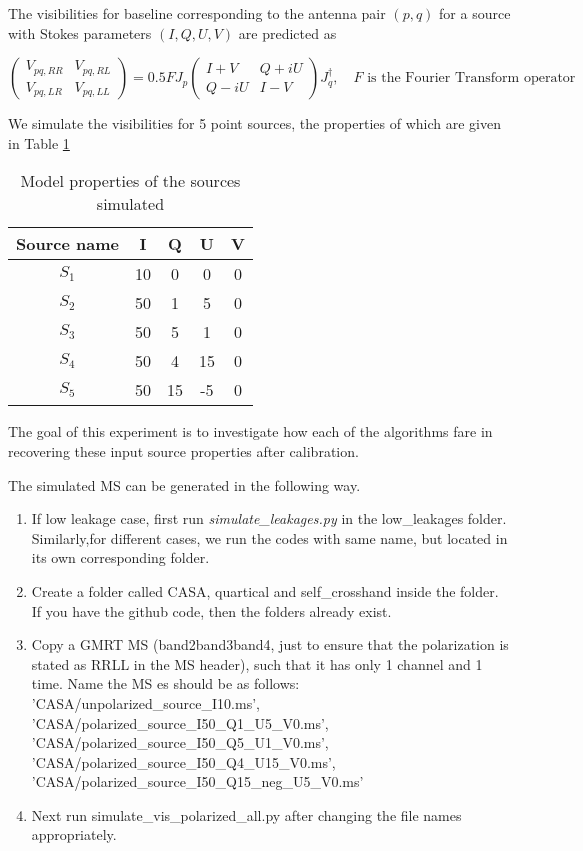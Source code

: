 \documentclass{article}
\begin{document}
The visibilities for baseline corresponding to the antenna pair $(p,q)$ for a source with Stokes parameters $(I,Q,U,V)$ are predicted as

\begin{equation}
\begin{pmatrix}
V_{pq,RR} & V_{pq,RL}\\
V_{pq,LR} & V_{pq,LL}
\end{pmatrix}=0.5 F J_p 
\begin{pmatrix}
I+V & Q+iU\\
Q-iU & I-V
\end{pmatrix}J_q^\dagger, \quad \text{$F$ is the Fourier Transform operator}
\end{equation}

We simulate the visibilities for 5 point sources, the properties of which are given in Table \ref{tab:source_props}

\begin{table}[!htbp]
\centering
\begin{tabular}{c|c|c|c|c}
Source name & I & Q & U & V  \\\hline
$S_1$ & 10 & 0 & 0 & 0\\
$S_2$ & 50 & 1 & 5  & 0\\
$S_3$ & 50 & 5 & 1 & 0\\
$S_4$ & 50 & 4 & 15 & 0\\
$S_5$ & 50 & 15 & -5 & 0
\end{tabular}
\caption{Model properties of the sources simulated}
\label{tab:source_props}
\end{table}

The goal of this experiment is to investigate how each of the algorithms fare in recovering these input source properties after calibration.

The simulated MS can be generated in the following way.

\begin{enumerate}
\item If low leakage case, first run \textit{simulate\_leakages.py} in the low\_leakages folder. Similarly,for different cases, we run the codes with same name, but located in its own corresponding folder.
\item Create a folder called CASA, quartical and self\_crosshand inside the folder. If you have the github code, then the folders already exist.
\item Copy a GMRT MS (band2\/band3\/band4, just to ensure that the polarization is stated as RR\/LL in the MS header), such that it has only 1 channel and 1 time. Name the MS es should be as follows: 'CASA/unpolarized\_source\_I10.ms', 'CASA/polarized\_source\_I50\_Q1\_U5\_V0.ms',  'CASA/polarized\_source\_I50\_Q5\_U1\_V0.ms',
 'CASA/polarized\_source\_I50\_Q4\_U15\_V0.ms',    'CASA/polarized\_source\_I50\_Q15\_neg\_U5\_V0.ms'
 \item Next run simulate\_vis\_polarized\_all.py after changing the file names appropriately.
\end{enumerate}
\end{document}
